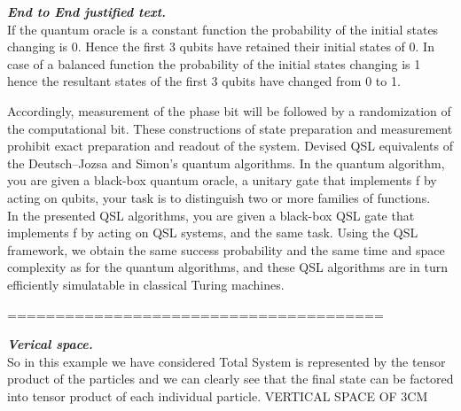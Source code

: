 \documentclass{article}
\begin{document}
	\begin{justify}
		
		
		\textit{\textbf{End to End justified text.}}\\
		
		If the quantum oracle is a constant function the probability of the initial states changing is 0. Hence the first 3 qubits have retained their initial states of 0. In case of a balanced function the probability of the initial states changing is 1 hence the resultant states of the first 3 qubits have changed from 0 to 1. %
		
		Accordingly, measurement of the phase bit will be followed by a randomization
		of the computational bit. These constructions of state preparation and measurement
		prohibit exact preparation and readout of the system. %
		Devised QSL equivalents of the Deutsch–Jozsa and Simon’s quantum algorithms. In
		the quantum algorithm, you are given a black-box quantum oracle, a unitary gate that
		implements f by acting on qubits, your task is to distinguish two or more families of
		functions.\\   %
		
		In the presented QSL algorithms, you are given a black-box QSL gate that implements f by acting on QSL systems, and the same task. Using the QSL framework, we obtain the same success probability and the same time and space complexity as for the quantum algorithms, and these QSL algorithms are in turn efficiently simulatable in classical Turing machines.

	\end{justify}			
	=======================================							
	
	\textbf{\textit{Verical space.}}\\
	So in this example we have considered Total System is represented by the tensor product of the particles and we can clearly see that the final state can be factored	into tensor product of each individual particle.
	VERTICAL SPACE OF 3CM
	
\end{document}
